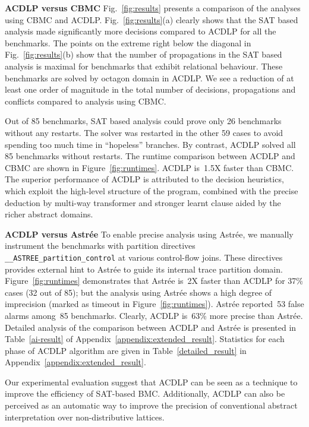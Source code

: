


%
\textbf{ACDLP versus CBMC}
Fig.~\ref{fig:results} presents a comparison of the analyses using CBMC
and ACDLP.  Fig.~\ref{fig:results}(a) clearly shows that the SAT based analysis 
made significantly more decisions compared to ACDLP for all the benchmarks. 
The points on the extreme right below the diagonal in
Fig.~\ref{fig:results}(b) show that the number of propagations in the SAT based 
analysis is maximal for benchmarks that exhibit relational behaviour.  These
benchmarks are solved by octagon domain in ACDLP.  We see a reduction of at 
least one order of magnitude in the total number of decisions, propagations and conflicts compared 
to analysis using CBMC.  

Out of 85 benchmarks, SAT based analysis could prove only 26
benchmarks without any restarts.  The solver was restarted in the other 59 
cases to avoid spending too much time in ``hopeless'' branches.  By contrast, 
ACDLP solved all 85 benchmarks without restarts.  
The runtime comparison between ACDLP and CBMC are shown in 
Figure~\ref{fig:runtimes}.  ACDLP is~1.5X faster than CBMC. 
The superior performance of ACDLP is attributed to the decision heuristics, 
which exploit the high-level structure of the program, combined with the 
precise deduction by multi-way transformer and stronger learnt clause aided 
by the richer abstract domains. 
%


\noindent \textbf{ACDLP versus Astr{\'e}e}
%
To enable precise analysis using Astr{\'e}e, we manually instrument 
the benchmarks with partition directives \texttt{\_\_ASTREE\_partition\_control} 
at various control-flow joins.  These directives provides external hint to
Astr{\'e}e to guide its internal trace partition domain. 
Figure~\ref{fig:runtimes} demonstrates that Astr{\'e}e is~2X faster 
than ACDLP for {37}\% cases (32 out of 85); but the analysis using 
Astr{\'e}e shows a high degree of imprecision (marked as timeout in 
Figure~\ref{fig:runtimes}).  Astr{\'e}e reported~53 false alarms among~85 benchmarks.  
Clearly, ACDLP is~63\% more precise than Astr{\'e}e. Detailed analysis of the comparison
between ACDLP and Astr{\'e}e is presented in Table~\ref{ai-result} of 
Appendix~\ref{appendix:extended_result}.  Statistics for each phase of ACDLP 
algorithm are given in Table~\ref{detailed_result} in 
Appendix~\ref{appendix:extended_result}.  


Our experimental evaluation suggest that ACDLP can be seen as a
technique to improve the efficiency of SAT-based BMC.  Additionally, ACDLP can
also be perceived as an automatic way to improve the precision of conventional
abstract interpretation over non-distributive lattices. 
